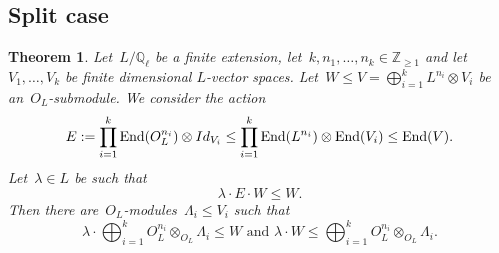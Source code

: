 \documentclass[12pt]{amsart}
\newtheorem{theorem}{Theorem}[section]
\newcommand{\End}{{\rm End}}
\newcommand{\Z}{{\mathbb Z}}
\newcommand{\Q}{{\mathbb Q}}
\newcommand{\tens}{\otimes}
\begin{document}
\subsection{Split case}
\begin{theorem}\label{thm:split linear}
Let~$L/\Q_\ell$ be a finite extension, let~$k,n_1,\ldots,n_k\in\Z_{\geq1}$ and let~$V_1,\ldots,V_k$ be finite dimensional $L$-vector spaces.
Let~$W\leq V= \bigoplus_{i=1}^k L^{n_i}\tens V_i$ be an~$O_L$-submodule.  We consider the action
\[
E:=\prod_{i=1}^k \End(O_L^{n_i})\tens Id_{V_i}\leq \prod_{i=1}^k\End(L^{n_i})\tens \End(V_i)\leq \End(V).
\]
Let~$\lambda\in L$ be such that
\[
\lambda \cdot E\cdot W\leq W.
\]
Then there are~$O_L$-modules~$\Lambda_i\leq V_i$ such that
\[
\lambda\cdot\bigoplus_{i=1}^k O_L^{n_i}\tens_{O_L} \Lambda_i\leq W
\text{ and }
\lambda\cdot W\leq \bigoplus_{i=1}^k O_L^{n_i}\tens_{O_L}\Lambda_i.
\]
\end{theorem}
\end{document}
